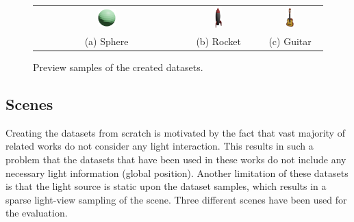\begingroup
\setlength{\tabcolsep}{40pt} %
\begin{figure}
    \centering
    \begin{tabular}{ccc}
          \includegraphics[width=0.13\textwidth]{figures/sphere.png}
          & \includegraphics[width=0.1\textwidth]{figures/rocket.png}
          & \includegraphics[width=0.13\textwidth]{figures/guitar.png}
          \\(a) Sphere & (b) Rocket & (c) Guitar
    \end{tabular}
    \caption{
    Preview samples of the created datasets.
}
\label{fig:dataset_preview}
\end{figure}
\endgroup

\subsection{Scenes}

Creating the datasets from scratch is motivated by the fact that
vast majority of related works do not consider any light interaction.
This results in such a problem that the datasets that have been used in these works
do not include any necessary light information (global position).
Another limitation of these datasets is that the light source is static upon the dataset samples,
which results in a sparse light-view sampling of the scene.
Three different scenes have been used for the evaluation.

